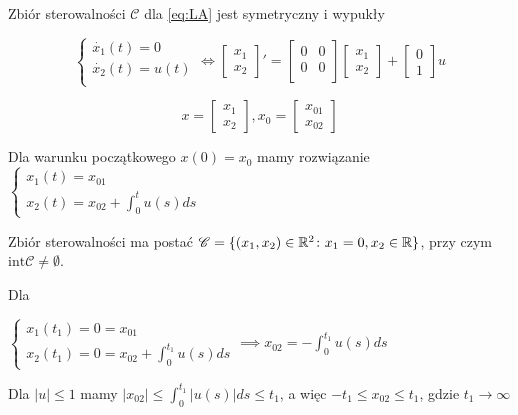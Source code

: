\begin{theorem}{}{}
    Zbiór sterowalności $\mathscr{C}$ dla \ref{eq:LA} jest symetryczny i wypukły

    \begin{example}[theorem]{}{}
        \[
            \begin{cases}
                \dot{x_1}(t) = 0 \\
                \dot{x_2}(t) = u(t) \\
            \end{cases} \iff
            \begin{bmatrix}
                x_1 \\
                x_2
            \end{bmatrix}' = \begin{bmatrix}
                0 & 0 \\
                0 & 0 \\
            \end{bmatrix} \begin{bmatrix} x_1 \\ x_2 \end{bmatrix} + \begin{bmatrix}
                0 \\ 1
            \end{bmatrix} u
        \]

        \[
            x = \begin{bmatrix}
                x_1 \\ x_2
            \end{bmatrix}, 
            x_0 = \begin{bmatrix}
                x_{01} \\ x_{02}
            \end{bmatrix}
        \]

        Dla warunku początkowego $x(0) = x_0$ mamy rozwiązanie $\begin{cases} 
            x_1(t) = x_{01} \\
            x_2(t) = x_{02} + \int_0^t u(s) ds
        \end{cases}$
    
        Zbiór sterowalności ma postać $\mathscr{C} = \{(x_1, x_2) \in \mathbb{R}^2 \colon x_1 = 0, x_2 \in \mathbb{R}\}$, przy czym $\text{int} \mathscr{C} \neq \emptyset$.

        Dla 

        $\begin{cases} 
            x_1(t_1) = 0 = x_{01} \\
            x_2(t_1) = 0 = x_{02} + \int_0^{t_1} u(s) ds
        \end{cases} \implies
        x_{02} = -\int_0^{t_1} u(s) ds$

        Dla $|u| \leq 1$ mamy $|x_{02}| \leq \int_0^{t_1}|u(s)| ds \leq t_1$, a więc $-t_1 \leq x_{02} \leq t_1$, gdzie $t_1 \to \infty$
    \end{example}
\end{theorem}

